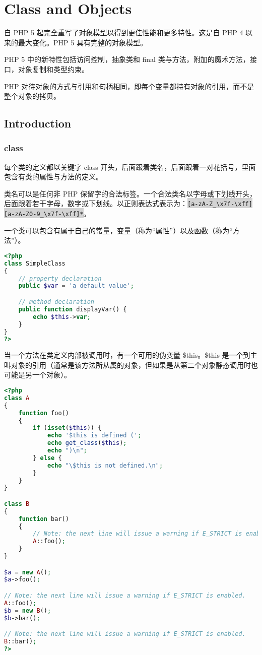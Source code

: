 \part{Class and Objects}


自 PHP 5 起完全重写了对象模型以得到更佳性能和更多特性。这是自 PHP 4 以来的最大变化。PHP 5 具有完整的对象模型。

PHP 5 中的新特性包括访问控制，抽象类和 final 类与方法，附加的魔术方法，接口，对象复制和类型约束。

PHP 对待对象的方式与引用和句柄相同，即每个变量都持有对象的引用，而不是整个对象的拷贝。


\chapter{Introduction}

\section{class}


每个类的定义都以关键字 class 开头，后面跟着类名，后面跟着一对花括号，里面包含有类的属性与方法的定义。

类名可以是任何非 PHP 保留字的合法标签。一个合法类名以字母或下划线开头，后面跟着若干字母，数字或下划线。以正则表达式表示为：\colorbox{lightgray}{\texttt{[a-zA-Z\_\textbackslash x7f-\textbackslash xff][a-zA-Z0-9\_\textbackslash x7f-\textbackslash xff]*}}。

一个类可以包含有属于自己的常量，变量（称为“属性”）以及函数（称为“方法”）。

\begin{lstlisting}[language=PHP]
<?php
class SimpleClass
{
    // property declaration
    public $var = 'a default value';

    // method declaration
    public function displayVar() {
        echo $this->var;
    }
}
?>
\end{lstlisting}

当一个方法在类定义内部被调用时，有一个可用的伪变量 \$this。\$this 是一个到主叫对象的引用（通常是该方法所从属的对象，但如果是从第二个对象静态调用时也可能是另一个对象）。




\begin{lstlisting}[language=PHP]
<?php
class A
{
    function foo()
    {
        if (isset($this)) {
            echo '$this is defined (';
            echo get_class($this);
            echo ")\n";
        } else {
            echo "\$this is not defined.\n";
        }
    }
}

class B
{
    function bar()
    {
        // Note: the next line will issue a warning if E_STRICT is enabled.
        A::foo();
    }
}

$a = new A();
$a->foo();

// Note: the next line will issue a warning if E_STRICT is enabled.
A::foo();
$b = new B();
$b->bar();

// Note: the next line will issue a warning if E_STRICT is enabled.
B::bar();
?>
\end{lstlisting}

